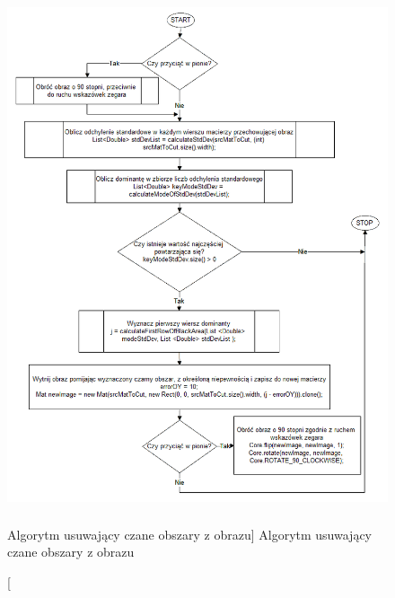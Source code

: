 \documentclass[a4paper,12pt]{article}
\begin{document}
    			\begin{figure}[!ht]  
    			    \begin{center}
    				    \includegraphics[height=15cm, width=12cm] {image//algorithm//cutBlackArea.png} 
    			    \end{center}
    			    \caption
        			[Algorytm usuwający czane obszary z obrazu]  
    	    		{Algorytm usuwający czane obszary z obrazu}  
    		    \end{figure}
		    
		        \newpage
		    
\end{document}
